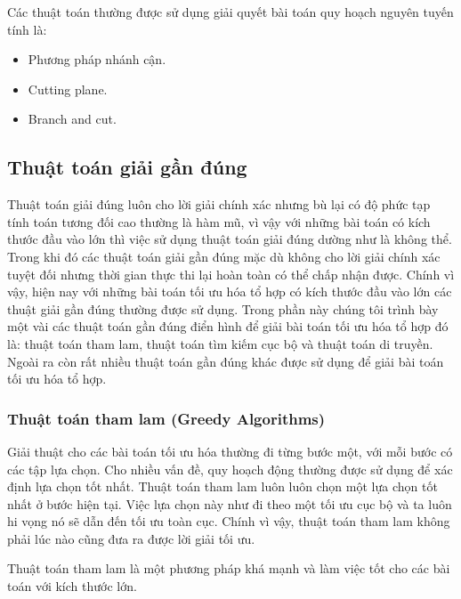 \documentclass[a4paper,12pt]{report}
\begin{document}
Các thuật toán thường được sử dụng giải quyết bài toán quy hoạch nguyên tuyến tính là: 
\begin{itemize}
\item Phương pháp nhánh cận.
\item Cutting plane.
\item Branch and cut.
\end{itemize}
\subsection{Thuật toán giải gần đúng}
Thuật toán giải đúng luôn cho lời giải chính xác nhưng bù lại có độ phức tạp tính toán tương đối cao thường là hàm mũ, vì vậy với những bài toán có kích thước đầu vào lớn thì việc sử dụng thuật toán giải đúng dường như là không thể. Trong khi đó các thuật toán giải gần đúng mặc dù không cho lời giải chính xác tuyệt đối nhưng thời gian thực thi lại hoàn toàn có thể chấp nhận được. Chính vì vậy, hiện nay với những bài toán tối ưu hóa tổ hợp có kích thước đầu vào lớn các thuật giải gần đúng thường được sử dụng. Trong phần này chúng tôi trình bày một vài các thuật toán gần đúng điển hình để giải bài toán tối ưu hóa tổ hợp đó là: thuật toán tham lam, thuật toán tìm kiếm cục bộ và thuật toán di truyền. Ngoài ra còn rất nhiều thuật toán gần đúng khác được sử dụng để giải bài toán tối ưu hóa tổ hợp.
\subsubsection{Thuật toán tham lam (Greedy Algorithms)}
Giải thuật cho các bài toán tối ưu hóa thường đi từng bước một, với mỗi bước có các tập lựa chọn. Cho nhiều vấn đề, quy hoạch động thường được sử dụng để xác định lựa chọn tốt nhất. Thuật toán tham lam \cite{ITA} luôn luôn chọn một lựa chọn tốt nhất ở bước hiện tại. Việc lựa chọn này như  đi theo một tối ưu cục bộ và ta luôn hi vọng nó sẽ dẫn đến tối ưu toàn cục. Chính vì vậy, thuật toán tham lam không phải lúc nào cũng đưa ra được lời giải tối ưu. 

Thuật toán tham lam là một phương pháp khá mạnh và làm việc tốt cho các bài toán với kích thước lớn. 


%
%
\end{document}
